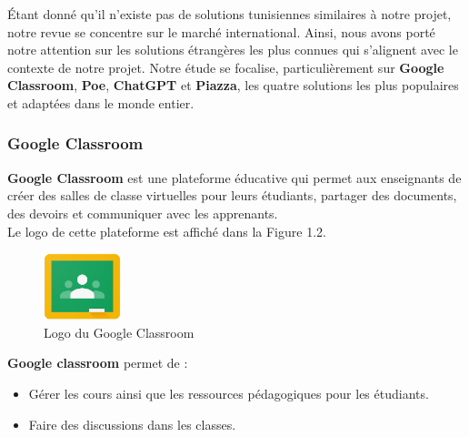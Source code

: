 \vspace{0.5em}
\noindent Étant donné qu’il n’existe pas de solutions tunisiennes similaires à notre projet, notre revue se concentre sur le marché international. Ainsi, nous avons porté notre attention sur les solutions étrangères les plus connues qui s'alignent avec le contexte de notre projet. Notre étude se focalise, particulièrement sur \textbf{Google Classroom}, \textbf{Poe}, \textbf{ChatGPT} et \textbf{Piazza}, les quatre solutions les plus populaires et adaptées dans le monde entier.

\subsubsection{Google Classroom}
\textbf{Google Classroom} est une plateforme éducative qui permet aux enseignants de créer des salles de classe virtuelles pour leurs étudiants, partager des documents, des devoirs et communiquer avec les apprenants.\\
Le logo de cette plateforme est affiché dans la Figure 1.2.
\begin{figure}[H]
    \centering
    \includegraphics[width=0.2\textwidth]{images/google-classroom-logo.png}
    \caption{Logo du Google Classroom \cite{googleClassroom}}
    \label{fig:google-classroom-logo}
\end{figure}
\noindent \textbf{Google classroom} permet de :
    \begin{itemize}[itemsep=1pt, parsep=1pt]
        \item Gérer les cours ainsi que les ressources pédagogiques pour les étudiants.
        \item Faire des discussions dans les classes.
    \end{itemize}

